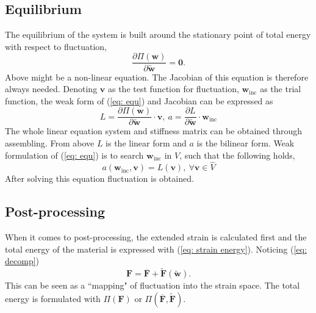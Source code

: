 \subsection{Equilibrium}
The equilibrium of the system is built around the stationary point of total energy with respect to fluctuation,
\begin{equation}
\label{eq: equ}
\dfrac{\partial \Pi(\mathbf{w})}{\partial \widetilde{\mathbf{w}}} = \mathbf{0}.
\end{equation}
Above might be a non-linear equation. The Jacobian of this equation is therefore always needed. Denoting $\mathbf{v}$ as the test function for fluctuation, $\mathbf{w}_{\text{inc}}$ as the trial function, the weak form of (\ref{eq: equ}) and Jacobian can be expressed as
\begin{equation}
\label{eq: bi and li}
L = \dfrac{\partial \Pi(\mathbf{w})}{\partial \widetilde{\mathbf{w}}} \cdot \mathbf{v}, \ a = \dfrac{\partial L}{\partial \widetilde{\mathbf{w}}} \cdot \mathbf{w}_{\text{inc}}
\end{equation}
The whole linear equation system and stiffness matrix can be obtained through assembling. From above $L$ is the linear form and $a$ is the bilinear form. Weak formulation of (\ref{eq: equ}) is to search $\mathbf{w}_{\text{inc}}$ in $V$, such that the following holds,
\begin{equation}
a(\mathbf{w}_{\text{inc}}, \mathbf{v}) = L(\mathbf{v}),\ \forall \mathbf{v} \in \hat{V}
\end{equation}
After solving this equation fluctuation is obtained.

\subsection{Post-processing}
When it comes to post-processing, the extended strain is calculated first and the total energy of the material is expressed with (\ref{eq: strain energy}). Noticing (\ref{eq: decomp})
\begin{equation}
\mathbf{F} = \overbar{\mathbf{F}} + \widetilde{\mathbf{F}}(\widetilde{\mathbf{w}}).
\end{equation}
This can be seen as a ``mapping" of fluctuation into the strain space. The total energy is formulated with $\Pi(\mathbf{F})$ or $\Pi(\overbar{\mathbf{F}},\widetilde{\mathbf{F}})$.

